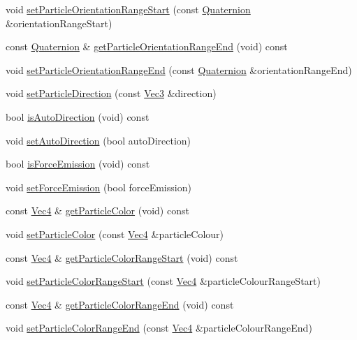 \begin{DoxyCompactItemize}
\item 
void \hyperlink{classPUEmitter_a1832a77324bd2c4097d29d8789b27e33}{set\+Particle\+Orientation\+Range\+Start} (const \hyperlink{classQuaternion}{Quaternion} \&orientation\+Range\+Start)
\item 
const \hyperlink{classQuaternion}{Quaternion} \& \hyperlink{classPUEmitter_ad7e34449d211958317bf8c2270b9631d}{get\+Particle\+Orientation\+Range\+End} (void) const
\item 
void \hyperlink{classPUEmitter_a4268d9ade8a9ff890397a2c74b0128b8}{set\+Particle\+Orientation\+Range\+End} (const \hyperlink{classQuaternion}{Quaternion} \&orientation\+Range\+End)
\item 
void \hyperlink{classPUEmitter_a999914161830d3b6cc2cbb6833f196af}{set\+Particle\+Direction} (const \hyperlink{classVec3}{Vec3} \&direction)
\item 
bool \hyperlink{classPUEmitter_acfb3f499a7dc29652bdd7c9d6970a9e5}{is\+Auto\+Direction} (void) const
\item 
void \hyperlink{classPUEmitter_a063a09ad3ae10313e1f87555798ec362}{set\+Auto\+Direction} (bool auto\+Direction)
\item 
bool \hyperlink{classPUEmitter_aa19a7d986cdfd7204aba3910192e8e27}{is\+Force\+Emission} (void) const
\item 
void \hyperlink{classPUEmitter_a95b92d550215d868305629b7a79b244b}{set\+Force\+Emission} (bool force\+Emission)
\item 
const \hyperlink{classVec4}{Vec4} \& \hyperlink{classPUEmitter_a8d13312f14f4205e4b27666e6a18338c}{get\+Particle\+Color} (void) const
\item 
void \hyperlink{classPUEmitter_a0d0e51b19fd247625f86ed120dc0fe94}{set\+Particle\+Color} (const \hyperlink{classVec4}{Vec4} \&particle\+Colour)
\item 
const \hyperlink{classVec4}{Vec4} \& \hyperlink{classPUEmitter_ac8272265219cb76a1fac1c76ef0295c4}{get\+Particle\+Color\+Range\+Start} (void) const
\item 
void \hyperlink{classPUEmitter_a90c804dc0561c3a3f19eb631e1c84646}{set\+Particle\+Color\+Range\+Start} (const \hyperlink{classVec4}{Vec4} \&particle\+Colour\+Range\+Start)
\item 
const \hyperlink{classVec4}{Vec4} \& \hyperlink{classPUEmitter_ad2280697609011dde8484dbbeda4efe4}{get\+Particle\+Color\+Range\+End} (void) const
\item 
void \hyperlink{classPUEmitter_ad4631d131294b6a7148b7914335d0d4f}{set\+Particle\+Color\+Range\+End} (const \hyperlink{classVec4}{Vec4} \&particle\+Colour\+Range\+End)

\end{DoxyCompactItemize}
